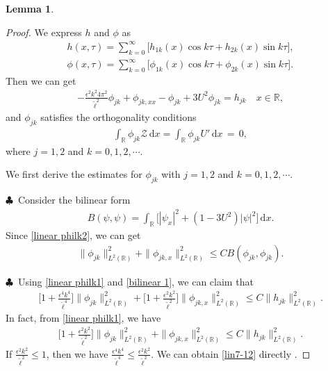 \documentclass[10pt, reqno]{amsart}
\numberwithin{equation}{section}
\newtheorem{lemma}[theorem]{Lemma}
\theoremstyle{definition}
\begin{document}
{{\begin{lemma}
\end{lemma}


\begin{proof}
 We express $h$ and $\phi$ as
\begin{align} \label{fourier-h}
 h(x, \tau) = \sum_{k=0}^\infty \Big[h_{1k} (x)\cos k\tau + h_{2k} (x)\sin k\tau\Big],
 \\[2mm]
 \label{fourier-phi}\phi(x, \tau) = \sum_{k=0}^\infty \Big[\phi_{1k} (x)\cos k\tau + \phi_{2k} (x)\sin k\tau\Big].
\end{align}
 Then we can  get
\begin{align} \label{linear philk1}
 - \frac{\epsilon^2k^2 4\pi^2}{{\tilde\ell}^2}\phi_{jk}+ \phi_{jk, xx} - \phi_{jk}+3U^2\phi_{jk} = h_{jk}\quad x\in {\mathbb R},
\end{align}
and $\phi_{jk}$ satisfies the orthogonality conditions
\begin{align} \label{linear philk2}
 \int_{\mathbb R}\phi_{jk}{\mathcal Z} \,{\mathrm d}x= \int_{\mathbb R}\phi_{jk} U' \,{\mathrm d}x \,=\, 0,
\end{align}
where $j=1,2$ and $k=0,1,2,\cdots$.

We first derive the estimates for $\phi_{jk}$ with $j=1,2$ and $k=0,1,2,\cdots$.

\smallskip\noindent$\clubsuit$\
 Consider the bilinear form
\begin{align*}
 B(\psi, \psi) = \int_{\mathbb R}\Big[|\psi_x|^2+ (1-3U^2)|\psi|^2 \Big] \,{\mathrm d}x.
\end{align*}
Since \eqref{linear philk2}, we can get
\begin{align} \label{bilinear 1}
 \|\phi_{jk}\|^2_{L^2({\mathbb R})} + \|\phi_{jk, x}\|^2_{L^2({\mathbb R})} \leq C B(\phi_{jk}, \phi_{jk}).
\end{align}

\smallskip\noindent$\clubsuit$\
Using \eqref{linear philk1} and \eqref{bilinear 1}, we can  claim that
\begin{align} \label{lin7-12}
\Bigg[1+\frac{\epsilon^4k^4}{{\tilde\ell}^4}\Bigg] \|\phi_{jk}\|^2_{L^2({\mathbb R})}
+ \Bigg[1+\frac{\epsilon^2k^2}{{\tilde\ell}^2}\Bigg] \|\phi_{jk, x}\|^2_{L^2({\mathbb R})} \leq C\|h_{jk}\|^2_{L^2({\mathbb R})}.
\end{align}
In fact, from \eqref{linear philk1}, we have
\begin{align*}
 \Bigg[1+\frac{\epsilon^2k^2}{{\tilde\ell}^2}\Bigg] \|\phi_{jk}\|^2_{L^2({\mathbb R})} + \|\phi_{jk, x}\|^2_{L^2({\mathbb R})} \leq C\|h_{jk}\|^2_{L^2({\mathbb R})}.
\end{align*}
 If $ \frac{\epsilon^2k^2}{{\tilde\ell}^2} \leq 1$, then we have $ \frac{\epsilon^4k^4}{{\tilde\ell}^4} \leq \frac{\epsilon^2k^2}{{\tilde\ell}^2}$. We can obtain \eqref{lin7-12}  directly .


\end{proof}}}
\end{document}
